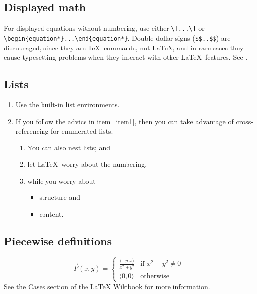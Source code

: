 \documentclass[11pt]{amsart}
\theoremstyle{definition}                  %
\theoremstyle{remark}                       %
\numberwithin{equation}{section}
\begin{document}
\subsection{Displayed math}
For displayed equations without numbering, use either \verb+\[...\]+ or \verb+\begin{equation*}...\end{equation*}+. 
Double dollar signs (\verb+$$..$$+) are discouraged, since they are \TeX\ commands, not \LaTeX, and in rare
  cases they cause typesetting problems when they interact with other \LaTeX\ features.  See \cite [\S 1.6]{tabu}.

\subsection{Lists}
\begin{enumerate}
\item Use the built-in list environments. \label{item1}
\item If you follow the advice in item~\ref{item1}, then you can take advantage of cross-referencing for enumerated lists.
\begin{enumerate}
\item You can also nest lists; and 
\item let \LaTeX\ worry about the numbering,
\item while you worry about 
\begin{itemize}
\item structure and
\item content.
\end{itemize}
\end{enumerate}


\end{enumerate}



\subsection{Piecewise definitions}
\begin{equation}
\vec{F}(x,y)=
	\begin{cases}
		 \frac{\langle -y,x\rangle}{x^2+y^2} & \text{if } x^2+y^2\neq 0\\
		\langle 0,0\rangle & \text{otherwise}
	\end{cases}
\end{equation}
See the \href{https://en.wikibooks.org/wiki/LaTeX/Advanced_Mathematics#The_cases_environment}{Cases section} of the LaTeX Wikibook \cite{wikibook} for more information.
\end{document}
